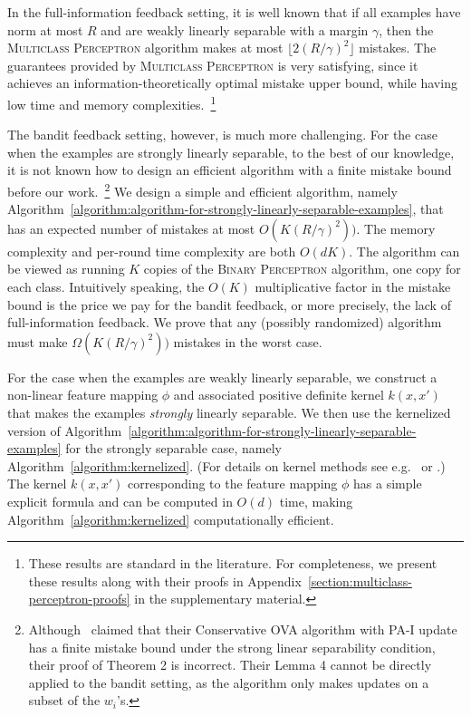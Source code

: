 In the full-information feedback setting, it is well known that if all examples
have norm at most $R$ and are weakly linearly separable with a margin $\gamma$,
then the \textsc{Multiclass Perceptron} algorithm makes at most $\lfloor
2(R/\gamma)^2 \rfloor$ mistakes.
The guarantees provided by \textsc{Multiclass
Perceptron} is very satisfying, since it achieves an information-theoretically
optimal mistake upper bound, while having low time and memory
complexities.~\footnote{These results are standard in the literature. For
completeness, we present these results along with their proofs in
Appendix~\ref{section:multiclass-perceptron-proofs} in the supplementary
material.}

The bandit feedback setting, however, is much more challenging. For the case
when the examples are strongly linearly separable, to the best of our knowledge,
it is not known how to design an efficient algorithm with a finite mistake bound
before our work.~\footnote{Although~\cite{Chen-Chen-Zhang-Chen-Zhang-2009}
claimed that their Conservative OVA algorithm with PA-I update has a finite
mistake bound under the strong linear separability condition, their proof of
Theorem 2 is incorrect. Their Lemma 4 cannot be directly applied to the bandit
setting, as the algorithm only makes updates on a subset of the $w_i$'s.} We
design a simple and efficient algorithm, namely
Algorithm~\ref{algorithm:algorithm-for-strongly-linearly-separable-examples},
that has an expected number of mistakes at most $O(K (R/\gamma)^2))$.
The memory complexity and per-round time complexity are both $O(dK)$.
The algorithm can be viewed as running $K$ copies of the \textsc{Binary
Perceptron} algorithm, one copy for each class. Intuitively speaking, the $O(K)$
multiplicative factor in the mistake bound is the price we pay for the bandit
feedback, or more precisely, the lack of full-information feedback. We prove
that any (possibly randomized) algorithm must make $\Omega(K (R/\gamma)^2))$
mistakes in the worst case.

For the case when the examples are weakly linearly separable, we construct a
non-linear feature mapping $\phi$ and associated positive definite kernel
$k(x,x')$ that makes the examples \emph{strongly} linearly separable. We then
use the kernelized version of
Algorithm~\ref{algorithm:algorithm-for-strongly-linearly-separable-examples}
for the strongly separable case, namely
Algorithm~\ref{algorithm:kernelized}. (For details on kernel methods see
e.g.~\citet{Scholkopf-Smola-2002} or \citet{Shawe-Taylor-Cristianini-2004}.)
The kernel $k(x,x')$ corresponding to the feature mapping $\phi$ has a simple
explicit formula and can be computed in $O(d)$ time,
making Algorithm~\ref{algorithm:kernelized} computationally efficient.

